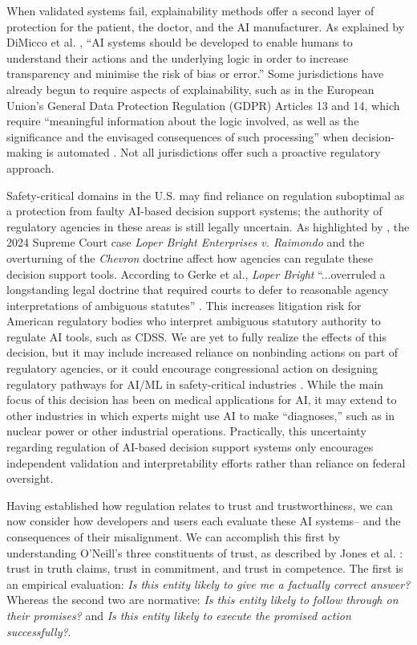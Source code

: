 \documentclass[authoryear,preprint,12pt]{elsarticle}
\begin{document}
When validated systems fail, explainability methods offer a second layer of
protection for the patient, the doctor, and the AI manufacturer. As explained by
DiMicco et al. \cite{demiccoRoboticsAIHealthcare2024}, ``AI systems should be
developed to enable humans to understand their actions and the underlying logic
in order to increase transparency and minimise the risk of bias or error.'' Some
jurisdictions have already begun to require aspects of explainability, such as
in the European Union's General Data Protection Regulation (GDPR) Articles 13
and 14, which require ``meaningful information about the logic involved, as well
as the significance and the envisaged consequences of such processing'' when
decision-making is automated \cite{lagioiaStrangeCaseDr2020}. Not all
jurisdictions offer such a proactive regulatory approach.

Safety-critical domains in the U.S. may find reliance on regulation suboptimal
as a protection from faulty AI-based decision support systems; the authority of
regulatory agencies in these areas is still legally uncertain. As highlighted by
\cite{gerkeNewCaseLaw2025}, the 2024 Supreme Court case \textit{Loper Bright
Enterprises v. Raimondo} \cite{loperbright} and the overturning of the
\textit{Chevron} doctrine affect how agencies can regulate these decision
support tools. According to Gerke et al., \textit{Loper Bright} ``...overruled a
longstanding legal doctrine that required courts to defer to reasonable agency
interpretations of ambiguous statutes'' \cite{gerkeChevronsFall}. This increases
litigation risk for American regulatory bodies who interpret ambiguous statutory
authority to regulate AI tools, such as CDSS. We are yet to fully realize the
effects of this decision, but it may include increased reliance on nonbinding
actions on part of regulatory agencies, or it could encourage congressional
action on designing regulatory pathways for AI/ML in safety-critical industries
\cite{gerkeChevronsFall}. While the main focus of this decision has been on
medical applications for AI, it may extend to other industries in which experts
might use AI to make ``diagnoses,'' such as in nuclear power or other industrial
operations. Practically, this uncertainty regarding regulation of AI-based
decision support systems only encourages independent validation and
interpretability efforts rather than reliance on federal oversight.

Having established how regulation relates to trust and trustworthiness, we can
now consider how developers and users each evaluate these AI systems-- and the
consequences of their misalignment. We can accomplish this first by
understanding O'Neill's three constituents of trust, as described by Jones et al.
\cite{jonesArtificialIntelligenceClinical2023}: trust in truth claims, trust in
commitment, and trust in competence. The first is an empirical evaluation:
\textit{Is this entity likely to give me a factually correct answer?} Whereas
the second two are normative: \textit{Is this entity likely to follow through on
their promises?} and \textit{Is this entity likely to execute the promised
action successfully?}. 
\end{document}
